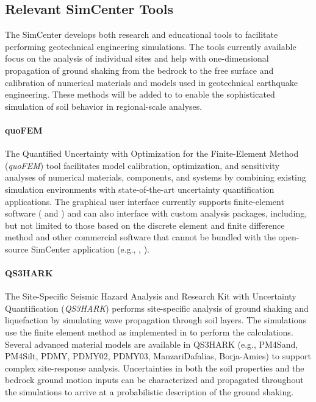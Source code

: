 \subsection{Relevant SimCenter Tools}

The SimCenter develops both research and educational tools to facilitate performing geotechnical engineering simulations. The tools currently available focus on the analysis of individual sites and help with one-dimensional propagation of ground shaking from the bedrock to the free surface and calibration of numerical materials and models used in geotechnical earthquake engineering. These methods will be added to  to enable the sophisticated simulation of soil behavior in regional-scale analyses.

\paragraph{quoFEM} The Quantified Uncertainty with Optimization for the Finite-Element Method (\emph{quoFEM}) tool facilitates model calibration, optimization, and sensitivity analyses of numerical materials, components, and systems by combining existing simulation environments with state-of-the-art uncertainty quantification applications. The graphical user interface currently supports finite-element software ( and ) and can also interface with custom analysis packages, including, but not limited to those based on the discrete element and finite difference method and other commercial software that cannot be bundled with the open-source SimCenter application (e.g., , ).

\paragraph{QS3HARK} The Site-Specific Seismic Hazard Analysis and Research Kit with Uncertainty Quantification (\emph{QS3HARK}) performs site-specific analysis of ground shaking and liquefaction by simulating wave propagation through soil layers. The simulations use the finite element method as implemented in  to perform the calculations. Several advanced material models are available in QS3HARK (e.g., PM4Sand, PM4Silt, PDMY, PDMY02, PDMY03, ManzariDafalias, Borja-Amies) to support complex site-response analysis. Uncertainties in both the soil properties and the bedrock ground motion inputs can be characterized and propagated throughout the simulations to arrive at a probabilistic description of the ground shaking.

